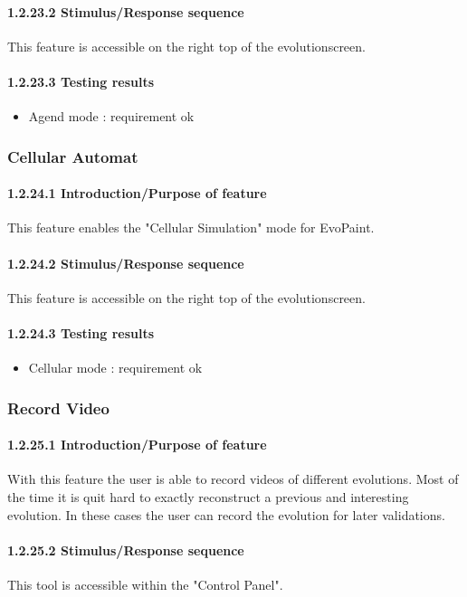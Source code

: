 \documentclass[titlepage,12pt]{scrartcl}
\begin{document}
\paragraph{1.2.23.2 Stimulus/Response sequence}
This feature is accessible on the right top of the evolutionscreen. 
\paragraph{1.2.23.3 Testing results}
\begin{itemize}
	\item Agend mode	: requirement ok
\end{itemize}


\subsubsection{Cellular Automat}
\paragraph{1.2.24.1 Introduction/Purpose of feature}
This feature enables the "Cellular Simulation" mode for EvoPaint.
\paragraph{1.2.24.2 Stimulus/Response sequence}
This feature is accessible on the right top of the evolutionscreen.
\paragraph{1.2.24.3 Testing results}
\begin{itemize}
	\item Cellular mode 	: requirement ok
\end{itemize}


\subsubsection{Record Video}
\paragraph{1.2.25.1 Introduction/Purpose of feature}
With this feature the user is able to record videos of different evolutions. Most of the time it is quit hard to exactly reconstruct a previous and interesting evolution. In these cases the user can record the evolution for later validations.
\paragraph{1.2.25.2 Stimulus/Response sequence}
This tool is accessible within the "Control Panel". 
\end{document}
